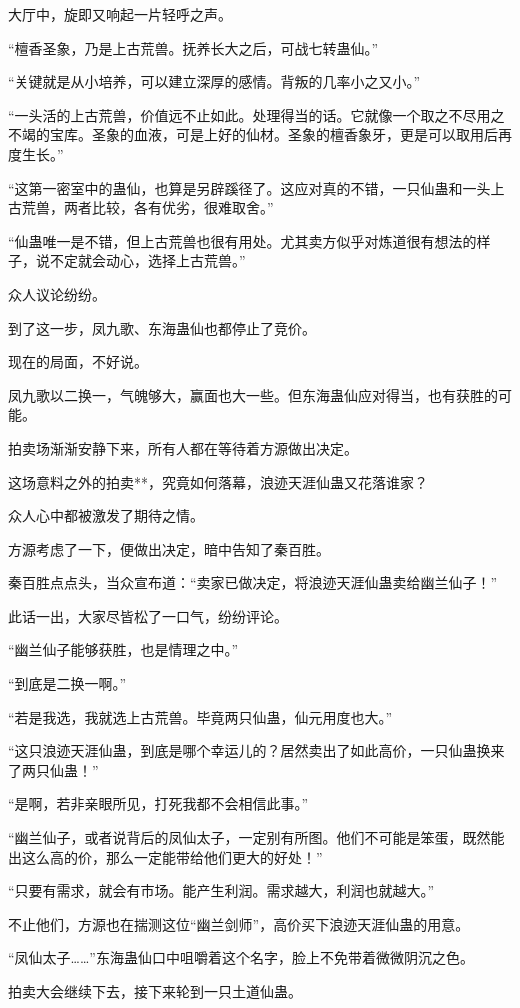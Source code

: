 \begin{this_body}
大厅中，旋即又响起一片轻呼之声。

“檀香圣象，乃是上古荒兽。抚养长大之后，可战七转蛊仙。”

“关键就是从小培养，可以建立深厚的感情。背叛的几率小之又小。”

“一头活的上古荒兽，价值远不止如此。处理得当的话。它就像一个取之不尽用之不竭的宝库。圣象的血液，可是上好的仙材。圣象的檀香象牙，更是可以取用后再度生长。”

“这第一密室中的蛊仙，也算是另辟蹊径了。这应对真的不错，一只仙蛊和一头上古荒兽，两者比较，各有优劣，很难取舍。”

“仙蛊唯一是不错，但上古荒兽也很有用处。尤其卖方似乎对炼道很有想法的样子，说不定就会动心，选择上古荒兽。”

众人议论纷纷。

到了这一步，凤九歌、东海蛊仙也都停止了竞价。

现在的局面，不好说。

凤九歌以二换一，气魄够大，赢面也大一些。但东海蛊仙应对得当，也有获胜的可能。

拍卖场渐渐安静下来，所有人都在等待着方源做出决定。

这场意料之外的拍卖**，究竟如何落幕，浪迹天涯仙蛊又花落谁家？

众人心中都被激发了期待之情。

方源考虑了一下，便做出决定，暗中告知了秦百胜。

秦百胜点点头，当众宣布道：“卖家已做决定，将浪迹天涯仙蛊卖给幽兰仙子！”

此话一出，大家尽皆松了一口气，纷纷评论。

“幽兰仙子能够获胜，也是情理之中。”

“到底是二换一啊。”

“若是我选，我就选上古荒兽。毕竟两只仙蛊，仙元用度也大。”

“这只浪迹天涯仙蛊，到底是哪个幸运儿的？居然卖出了如此高价，一只仙蛊换来了两只仙蛊！”

“是啊，若非亲眼所见，打死我都不会相信此事。”

“幽兰仙子，或者说背后的凤仙太子，一定别有所图。他们不可能是笨蛋，既然能出这么高的价，那么一定能带给他们更大的好处！”

“只要有需求，就会有市场。能产生利润。需求越大，利润也就越大。”

不止他们，方源也在揣测这位“幽兰剑师”，高价买下浪迹天涯仙蛊的用意。

“凤仙太子……”东海蛊仙口中咀嚼着这个名字，脸上不免带着微微阴沉之色。

拍卖大会继续下去，接下来轮到一只土道仙蛊。


\end{this_body}
